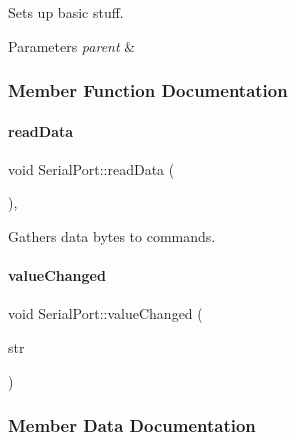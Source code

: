 Sets up basic stuff. 


\begin{DoxyParams}{Parameters}
{\em parent} & \\
\hline
\end{DoxyParams}


\subsubsection{Member Function Documentation}
\mbox{\label{classSerialPort_a0b8fe1371e829199856e8cae942de94e}} 
\paragraph{\texorpdfstring{read\+Data}{readData}}
{\footnotesize\ttfamily void Serial\+Port\+::read\+Data (\begin{DoxyParamCaption}{ }\end{DoxyParamCaption})\hspace{0.3cm}{\ttfamily [private]}, {\ttfamily [slot]}}



Gathers data bytes to commands. 

\mbox{\label{classSerialPort_a7313923f2de05683b56acce7c3bac7ff}} 
\paragraph{\texorpdfstring{value\+Changed}{valueChanged}}
{\footnotesize\ttfamily void Serial\+Port\+::value\+Changed (\begin{DoxyParamCaption}\item[{Q\+String}]{str }\end{DoxyParamCaption})\hspace{0.3cm}{\ttfamily [signal]}}



\subsubsection{Member Data Documentation}
\mbox{\label{classSerialPort_aa5417aaf7597e7b7349f9871a8dd5b2f}} 

